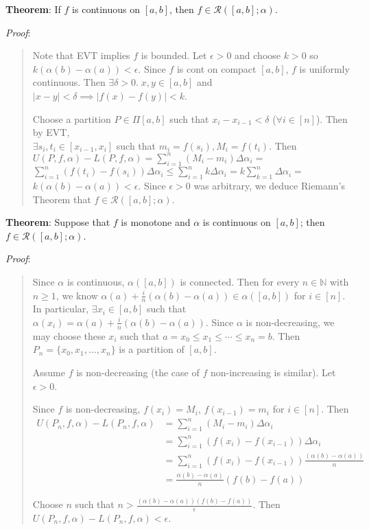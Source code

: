 \documentclass[11pt]{article}
\begin{document}
\textbf{Theorem}: If $f$ is continuous on $[a,b]$, then $f \in \mathcal{R}([a,b]; \alpha)$.

\emph{Proof}:
\begin{quote}\vspace{-0.3cm}
Note that EVT implies $f$ is bounded. Let $\epsilon > 0$ and choose $k > 0$ so $k(\alpha(b) - \alpha(a)) < \epsilon$. Since $f$ is cont on compact $[a,b]$, $f$ is uniformly continuous. Then $\exists \delta > 0.\; x,y \in [a,b]$ and $|x-y| < \delta \implies |f(x) - f(y)| < k$.

Choose a partition $P \in \Pi[a,b]$ such that $x_i - x_{i-1} < \delta$ ($\forall i \in [n]$). Then by EVT,\\ $\exists s_i, t_i \in [x_{i-1}, x_i]$ such that $m_i = f(s_i), M_i = f(t_i)$. Then $U(P, f, \alpha) - L(P, f, \alpha) = \sum_{i=1}^n (M_i - m_i) \Delta \alpha_i =$ $\sum_{i=1}^n (f(t_i) - f(s_i)) \Delta \alpha_i \leq \sum_{i=1}^n k \Delta \alpha_i = k \sum_{k=1}^n \Delta \alpha_i =$\\ $k (\alpha(b) - \alpha(a)) < \epsilon$. Since $\epsilon > 0$ was arbitrary, we deduce Riemann's Theorem that $f \in \mathcal{R}([a,b]; \alpha)$.
\end{quote}

\textbf{Theorem}: Suppose that $f$ is monotone and $\alpha$ is continuous on $[a,b]$; then $f \in \mathcal{R}([a,b]; \alpha)$.

\emph{Proof}:
\begin{quote}
Since $\alpha$ is continuous, $\alpha([a,b])$ is connected. Then for every $n \in \mathbb{N}$ with $n \geq 1$, we know $\alpha(a) + \frac{i}{n}(\alpha(b) - \alpha(a)) \in \alpha([a,b])$ for $i \in [n]$. In particular, $\exists x_i \in [a,b]$ such that $\alpha(x_i) = \alpha(a) + \frac{i}{n} (\alpha(b) - \alpha(a))$. Since $\alpha$ is non-decreasing, we may choose these $x_i$ such that $a = x_0 \leq x_1 \leq \cdots \leq x_n = b$. Then $P_n = \{x_0, x_1, \ldots, x_n\}$ is a partition of $[a,b]$.

Assume $f$ is non-decreasing (the case of $f$ non-increasing is similar). Let $\epsilon > 0$.

Since $f$ is non-decreasing, $f(x_i) = M_i$, $f(x_{i-1}) = m_i$ for $i \in [n]$. Then
\begin{align*}
U(P_n, f, \alpha) - L(P_n, f, \alpha) &= \sum_{i=1}^n (M_i - m_i) \Delta \alpha_i\\
&= \sum_{i=1}^n (f(x_i) - f(x_{i-1})) \Delta \alpha_i\\
&= \sum_{i=1}^n (f(x_i) - f(x_{i-1})) \frac{(\alpha(b) - \alpha(a))}{n}\\
&= \frac{\alpha(b) - \alpha(a)}{n} (f(b) - f(a))
\end{align*}

Choose $n$ such that $n > \frac{(\alpha(b) - \alpha(a))(f(b) - f(a))}{\epsilon}$. Then $U(P_n, f, \alpha) - L(P_n, f, \alpha) < \epsilon$.
\end{quote}
\end{document}
